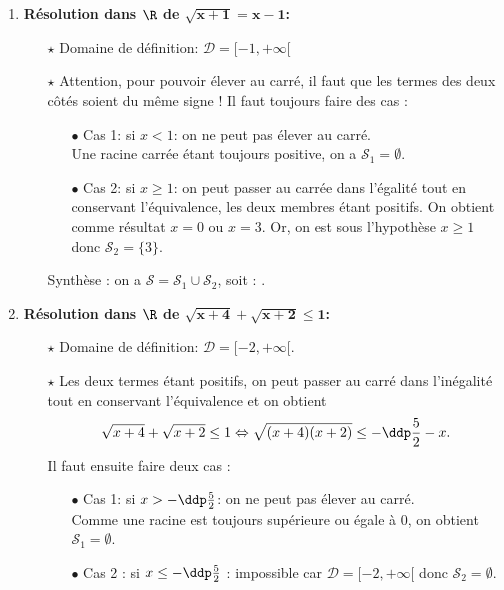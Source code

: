 \begin{correction} 
\begin{enumerate}
\item \textbf{R\'esolution dans $\mathbf{\R}$ de $\mathbf{\sqrt{x+1}=x-1}$:}\\
\begin{itemize}
\item[$\star$] Domaine de d\'efinition: $\mathcal{D}=\lbrack -1,+\infty\lbrack$
\item[$\star$] Attention, pour pouvoir \'elever au carr\'e, il faut que les termes des deux c\^ot\'es soient du m\^eme signe ! Il faut toujours faire des cas :
\begin{itemize}
\item[$\bullet$] Cas 1: si $x<1$: on ne peut pas \'elever au carr\'e.\\
\noindent Une racine carr\'ee \'etant toujours positive, on a $\mathcal{S}_1=\emptyset$.
\item[$\bullet$] Cas 2: si $x\geq 1$: on peut passer au carr\'ee dans l'\'egalit\'e tout en conservant l'\'equivalence, les deux membres \'etant positifs. On obtient comme r\'esultat $x=0$ ou $x=3$. Or, on est sous l'hypoth\`ese $x\geq 1$ donc $\mathcal{S}_2=\lbrace 3 \rbrace$.
\end{itemize}
Synth\`ese : on a $\mathcal{S} = \mathcal{S}_1 \cup \mathcal{S}_2$, soit : .
\end{itemize} 
\item \textbf{R\'esolution dans $\mathbf{\R}$ de $\mathbf{\sqrt{x+4}+\sqrt{x+2}\leq 1}$:}\\
\noindent \begin{itemize}
\item[$\star$] Domaine de d\'efinition: $\mathcal{D}=\lbrack -2,+\infty\lbrack$.
\item[$\star$] Les deux termes \'etant positifs, on peut passer au carr\'e dans l'in\'egalit\'e tout en conservant l'\'equivalence et on obtient 
$$\sqrt{x+4}+\sqrt{x+2}\leq 1 \Leftrightarrow \sqrt{(x+4)(x+2)}\leq -\ddp\frac{5}{2}-x.$$
Il faut ensuite faire deux cas :
\begin{itemize}
\item[$\bullet$] Cas 1: si $x>-\ddp\frac{5}{2}$: on ne peut pas \'elever au carr\'e.\\
Comme une racine est toujours sup\'erieure ou \'egale \`a 0, on obtient $\mathcal{S}_1=\emptyset$.
\item[$\bullet$] Cas 2 : si $x\leq -\ddp\frac{5}{2}$ : impossible car $\mathcal{D}=\lbrack -2,+\infty\lbrack$ donc $\mathcal{S}_2=\emptyset$.

\end{itemize}
\end{itemize}
\end{enumerate}
\end{correction}
